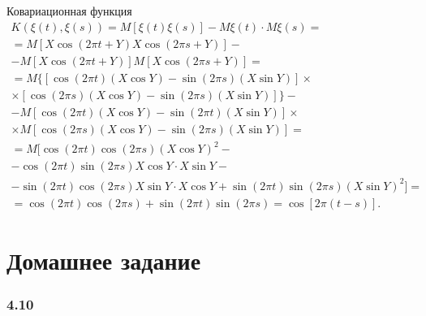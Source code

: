 \begin{enumerate}[label=\alph*)]
  Ковариационная функция
  \begin{gather*}
    K \left( \xi \left( t \right), \xi \left( s \right) \right) =
    M \left[ \xi \left( t \right) \xi \left( s \right) \right] -
    M \xi \left( t \right) \cdot M \xi \left( s \right) = \\
    = M \left[ X \cos \left( 2 \pi t + Y \right) X \cos \left( 2 \pi s + Y \right) \right] - \\
    - M \left[ X \cos \left( 2 \pi t + Y \right) \right]
    M \left[ X \cos \left( 2 \pi s + Y \right) \right] = \\
    = M\{ \left[
      \cos \left( 2 \pi t \right) \left( X \cos Y \right) -
      \sin \left( 2 \pi s \right) \left( X \sin Y \right) \right] \times \\
      \times \left[ \cos \left( 2 \pi s \right) \left( X \cos Y \right) -
      \sin \left( 2 \pi s \right) \left( X \sin Y \right) \right] \} - \\
    - M \left[
      \cos \left( 2 \pi t \right) \left( X \cos Y \right) -
      \sin \left( 2 \pi t \right) \left( X \sin Y \right) \right] \times \\
    \times M \left[ \cos \left( 2 \pi s \right) \left( X \cos Y \right) -
      \sin \left( 2 \pi s \right) \left( X \sin Y \right) \right] = \\
    = M[
      \cos \left( 2 \pi t \right) \cos \left( 2 \pi s \right) \left( X \cos Y \right)^2 - \\
      - \cos \left( 2 \pi t \right) \sin \left( 2 \pi s \right) X \cos Y \cdot X \sin Y - \\
      - \sin \left( 2 \pi t \right) \cos \left( 2 \pi s \right) X \sin Y \cdot X \cos Y +
      \sin \left( 2 \pi t \right) \sin \left( 2 \pi s \right) \left( X \sin Y \right)^2 ] = \\
    = \cos \left( 2 \pi t \right) \cos \left( 2 \pi s \right) +
    \sin \left( 2 \pi t \right) \sin \left( 2 \pi s \right) =
    \cos \left[ 2 \pi \left( t - s \right) \right].
  \end{gather*}
\end{enumerate}

\section*{Домашнее задание}

\subsubsection*{4.10}


